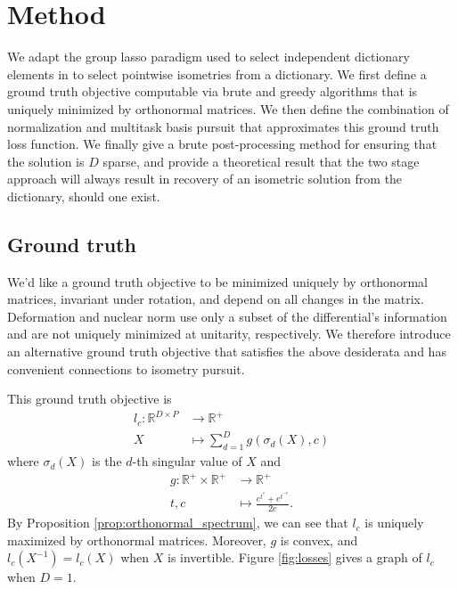 \section{Method}

We adapt the group lasso paradigm used to select independent dictionary elements in \citet{Koelle2022-ju, Koelle2024-no} to select pointwise isometries from a dictionary.
We first define a ground truth objective computable via brute and greedy algorithms that is uniquely minimized by orthonormal matrices.
We then define the combination of normalization and multitask basis pursuit that approximates this ground truth loss function.
We finally give a brute post-processing method for ensuring that the solution is $D$ sparse, and provide a theoretical result that the two stage approach will always result in recovery of an isometric solution from the dictionary, should one exist.

\subsection{Ground truth}
\label{sec:ground_truth}

We'd like a ground truth objective to be minimized uniquely by orthonormal matrices, invariant under rotation, and depend on all changes in the matrix.
Deformation \citep{Kohli2021-lr} and nuclear norm \citep{Boyd2004-ql} use only a subset of the differential's information and are not uniquely minimized at unitarity, respectively.
We therefore introduce an alternative ground truth objective that satisfies the above desiderata and has convenient connections to isometry pursuit.

This ground truth objective is
\begin{align}
l_{c}: \mathbb R^{D \times P} &\to \mathbb R^{+} \\
X &\mapsto \sum_{d = 1}^D g(\sigma_d( X), c)
\end{align}
where $\sigma_d ( X)$ is the $d$-th singular value of $ X$ and
\begin{align}
g: \mathbb R^+ \times \mathbb R^+ &\to \mathbb R^+ \\
t,c &\mapsto \frac{e^{t^c} + e^{t^{-c}}}{2e}.
\end{align}
By Proposition \ref{prop:orthonormal_spectrum}, we can see that $l_c$ is uniquely maximized by orthonormal matrices.
Moreover, $g$ is convex, and $l_c( X^{-1}) = l_c( X)$ when $X$ is invertible.
Figure \ref{fig:losses} gives a graph of $l_c$ when $D=1$.

